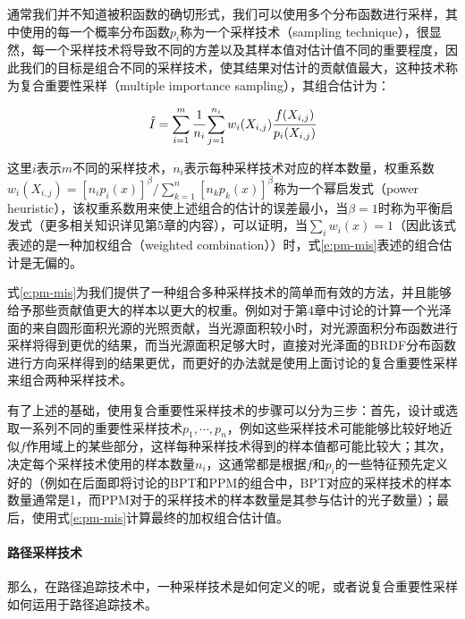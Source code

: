 通常我们并不知道被积函数的确切形式，我们可以使用多个分布函数进行采样，其中使用的每一个概率分布函数$p_i$称为一个采样技术（sampling technique），很显然，每一个采样技术将导致不同的方差以及其样本值对估计值不同的重要程度，因此我们的目标是组合不同的采样技术，使其结果对估计的贡献值最大，这种技术称为复合重要性采样（multiple importance sampling），其组合估计为：

\begin{equation}\label{e:pm-mis}
	\hat{I}=\sum^{m}_{i=1} \cfrac{1}{n_i}\sum^{n_i}_{j=1}w_i(X_{i,j}) \cfrac{f(X_{i,j})}{p_i(X_{i,j})}
\end{equation}

这里$i$表示$m$不同的采样技术，$n_i$表示每种采样技术对应的样本数量，权重系数$w_i(X_{i,j})=[n_ip_i(x)]^{\beta}/\sum^{n}_{k=1}[n_kp_k(x)]^{\beta}$称为一个幂启发式（power heuristic），该权重系数用来使上述组合的估计的误差最小，当$\beta=1$时称为平衡启发式（更多相关知识详见第5章的内容），可以证明，当$\sum_iw_i(x)=1$（因此该式表述的是一种加权组合（weighted combination））时，式\ref{e:pm-mis}表述的组合估计是无偏的。

式\ref{e:pm-mis}为我们提供了一种组合多种采样技术的简单而有效的方法，并且能够给予那些贡献值更大的样本以更大的权重。例如对于第4章中讨论的计算一个光泽面的来自圆形面积光源的光照贡献，当光源面积较小时，对光源面积分布函数进行采样将得到更优的结果，而当光源面积足够大时，直接对光泽面的BRDF分布函数进行方向采样得到的结果更优，而更好的办法就是使用上面讨论的复合重要性采样来组合两种采样技术。

有了上述的基础，使用复合重要性采样技术的步骤可以分为三步：首先，设计或选取一系列不同的重要性采样技术$p_1,\cdots,p_n$，例如这些采样技术可能能够比较好地近似$f$作用域上的某些部分，这样每种采样技术得到的样本值都可能比较大；其次，决定每个采样技术使用的样本数量$n_i$，这通常都是根据$f$和$p_i$的一些特征预先定义好的（例如在后面即将讨论的BPT和PPM的组合中，BPT对应的采样技术的样本数量通常是1，而PPM对于的采样技术的样本数量是其参与估计的光子数量）；最后，使用式\ref{e:pm-mis}计算最终的加权组合估计值。




\paragraph{路径采样技术}
那么，在路径追踪技术中，一种采样技术是如何定义的呢，或者说复合重要性采样如何运用于路径追踪技术。

